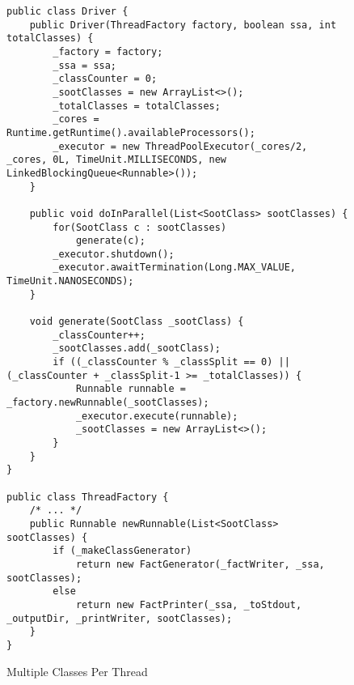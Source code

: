 \documentclass{dithesis}
\begin{document}
        \begin{figure}[H]
\begin{lstlisting}
public class Driver {
    public Driver(ThreadFactory factory, boolean ssa, int totalClasses) {
        _factory = factory;
        _ssa = ssa;
        _classCounter = 0;
        _sootClasses = new ArrayList<>();
        _totalClasses = totalClasses;
        _cores = Runtime.getRuntime().availableProcessors();
        _executor = new ThreadPoolExecutor(_cores/2, _cores, 0L, TimeUnit.MILLISECONDS, new LinkedBlockingQueue<Runnable>());
    }

    public void doInParallel(List<SootClass> sootClasses) {
        for(SootClass c : sootClasses)
            generate(c);
        _executor.shutdown();
        _executor.awaitTermination(Long.MAX_VALUE, TimeUnit.NANOSECONDS);
    }

    void generate(SootClass _sootClass) {
        _classCounter++;
        _sootClasses.add(_sootClass);
        if ((_classCounter % _classSplit == 0) || (_classCounter + _classSplit-1 >= _totalClasses)) {
            Runnable runnable = _factory.newRunnable(_sootClasses);
            _executor.execute(runnable);
            _sootClasses = new ArrayList<>();
        }
    }
}

public class ThreadFactory {
    /* ... */
    public Runnable newRunnable(List<SootClass> sootClasses) {
        if (_makeClassGenerator)
            return new FactGenerator(_factWriter, _ssa, sootClasses);
        else
            return new FactPrinter(_ssa, _toStdout, _outputDir, _printWriter, sootClasses);
    }
}
\end{lstlisting}
        \caption{Multiple Classes Per Thread}
        \end{figure}
\end{document}
